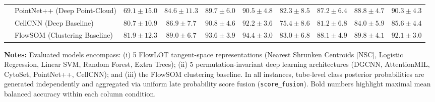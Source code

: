 \documentclass[10pt]{article}
\begin{document}
\begin{table}[p]
\begin{tabular}{ll cccc cccc}
 & PointNet++ (Deep Point-Cloud) & $69.1 \pm 15.0$ & $84.6 \pm 11.3$ & $89.7 \pm 6.0$ & $90.5 \pm 4.8$ & $82.3 \pm 8.5$ & $87.2 \pm 6.4$ & $88.8 \pm 4.7$ & $90.3 \pm 4.3$ \\
 & CellCNN (Deep Baseline) & $80.7 \pm 10.9$ & $86.9 \pm 7.7$ & $90.8 \pm 4.6$ & $92.2 \pm 3.6$ & $75.4 \pm 8.6$ & $81.2 \pm 6.8$ & $84.0 \pm 5.9$ & $85.6 \pm 4.4$ \\
 & FlowSOM (Clustering Baseline) & $81.9 \pm 12.3$ & $89.0 \pm 6.7$ & $93.6 \pm 3.9$ & $94.4 \pm 3.0$ & $83.0 \pm 6.8$ & $88.1 \pm 4.9$ & $89.8 \pm 4.1$ & $92.1 \pm 3.0$ \\
\bottomrule
\end{tabular}

\vspace{5pt}
\begin{minipage}{0.98\textwidth}
\footnotesize
\textbf{Notes:} Evaluated models encompass: (i) 5 FlowLOT tangent-space representations (Nearest Shrunken Centroids [NSC], Logistic Regression, Linear SVM, Random Forest, Extra Trees); (ii) 5 permutation-invariant deep learning architectures (DGCNN, AttentionMIL, CytoSet, PointNet++, CellCNN); and (iii) the FlowSOM clustering baseline. In all instances, tube-level class posterior probabilities are generated independently and aggregated via uniform late probability score fusion (\texttt{score\_fusion}). Bold numbers highlight maximal mean balanced accuracy within each column condition.
\end{minipage}
\end{table}

\clearpage
\end{document}
